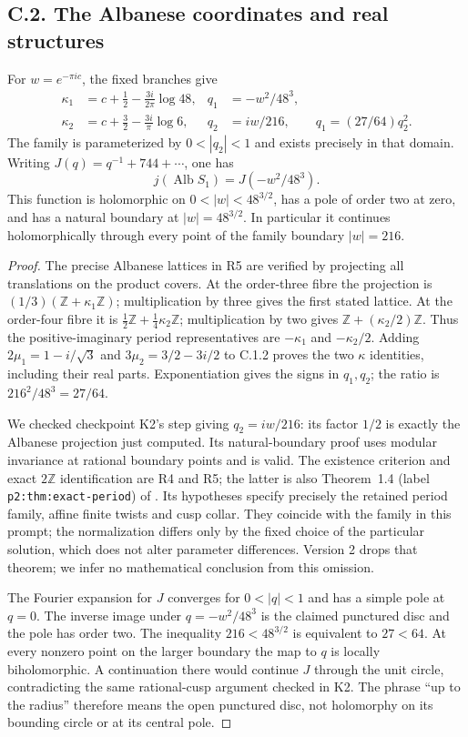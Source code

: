 \subsection{C.2. The Albanese coordinates and real structures}
\begin{statement}
For $w=e^{-\pi ic}$, the fixed branches give
\begin{align*}
 \kappa_1&=c+\tfrac12-\frac{3i}{2\pi}\log48,&
 q_1&=-w^2/48^3,\\
 \kappa_2&=c+\tfrac32-\frac{3i}{\pi}\log6,&
 q_2&=iw/216,\qquad q_1=(27/64)q_2^2.
\end{align*}
The family is parameterized by $0<|q_2|<1$ and exists precisely in
that domain. Writing $J(q)=q^{-1}+744+\cdots$, one has
\[
 j(\operatorname{Alb}S_1)=J(-w^2/48^3).
\]
This function is holomorphic on $0<|w|<48^{3/2}$, has a pole of order
two at zero, and has a natural boundary at $|w|=48^{3/2}$.
In particular it continues holomorphically through every point of the
family boundary $|w|=216$.
\end{statement}
\begin{proof}
The precise Albanese lattices in R5 are verified by projecting all
translations on the product covers. At the order-three fibre the
projection is $(1/3)(\mathbb Z+\kappa_1\mathbb Z)$; multiplication by
three gives the first stated lattice. At the order-four fibre it is
$\tfrac12\mathbb Z+\tfrac14\kappa_2\mathbb Z$; multiplication by two
gives $\mathbb Z+(\kappa_2/2)\mathbb Z$. Thus the positive-imaginary
period representatives are $-\kappa_1$ and $-\kappa_2/2$.
Adding $2\mu_1=1-i/\sqrt3$ and
$3\mu_2=3/2-3i/2$ to C.1.2 proves the two $\kappa$ identities,
including their real parts. Exponentiation gives the signs in $q_1,q_2$;
the ratio is $216^2/48^3=27/64$.

We checked checkpoint K2's step giving $q_2=iw/216$: its factor
$1/2$ is exactly the Albanese projection just computed. Its
natural-boundary proof uses modular invariance at rational boundary
points and is valid. The existence criterion and exact $2\mathbb Z$
identification are R4 and R5; the latter is also Theorem~1.4
(label \texttt{p2:thm:exact-period}) of
\cite{DuGuoKusakabeXie2026v1}. Its hypotheses specify precisely the
retained period family, affine finite twists and cusp collar. They
coincide with the family in this prompt; the normalization differs
only by the fixed choice of the particular solution, which does not
alter parameter differences. Version 2 drops that theorem; we infer
no mathematical conclusion from this omission.

The Fourier expansion for $J$ converges for $0<|q|<1$ and has a simple
pole at $q=0$. The inverse image under $q=-w^2/48^3$ is the claimed
punctured disc and the pole has order two. The inequality
$216<48^{3/2}$ is equivalent to $27<64$. At every nonzero point on the
larger boundary the map to $q$ is locally biholomorphic. A continuation
there would continue $J$ through the unit circle, contradicting the
same rational-cusp argument checked in K2. The phrase ``up to the
radius'' therefore means the open punctured disc, not holomorphy on
its bounding circle or at its central pole.
\end{proof}

